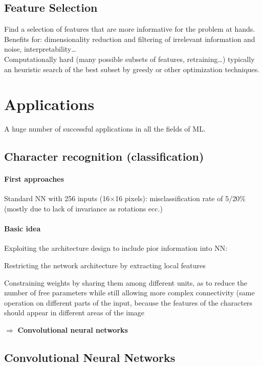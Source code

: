\documentclass[10pt]{report}
\begin{document}
\subsection{Feature Selection} Find a selection of features that are more informative for the problem at hands. Benefits for: dimensionality reduction and filtering of irrelevant information and noise, interpretability\ldots\\
Computationally hard (many possible subsets of features, retraining\ldots) typically an heuristic search of the best subset by greedy or other optimization techniques.
\section{Applications} A huge number of successful applications in all the fields of ML.
\subsection{Character recognition (classification)}
\paragraph{First approaches} Standard NN with 256 inputs (16$\times$16 pixels): misclassification rate of 5/20\% (mostly due to lack of invariance as rotations ecc.)
\paragraph{Basic idea} Exploiting the architecture design to include pior information into NN:
\begin{list}{}{}
	\item Restricting the network architecture by extracting local features
	\item Constraining weights by sharing them among different units, as to reduce the number of free parameters while still allowing more complex connectivity (same operation on different parts of the input, because the features of the characters should appear in different areas of the image
\end{list}
$\Rightarrow$ \textbf{Convolutional neural networks}
\subsection{Convolutional Neural Networks}
\end{document}
